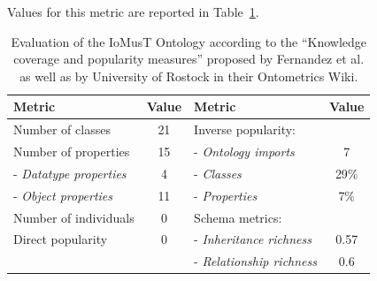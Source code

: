 Values for this metric are reported in Table~\ref{tab:metrics}.

\begin{table}[h]
    \centering
        \caption{Evaluation of the IoMusT Ontology according to the ``Knowledge coverage and popularity measures'' proposed by Fernandez et al. \cite{fernandez2009what} as well as by University of Rostock in their Ontometrics Wiki\protect\footnotemark.}
    \label{tab:metrics}
    \begin{tabular}{lc||lc}
    \toprule
    \textbf{Metric} & \textbf{Value} & \textbf{Metric} & \textbf{Value}\\
    \midrule
        Number of classes & 21 & Inverse popularity: &  \\
        Number of properties & 15 & - \textit{Ontology imports} & 7\\
        - \textit{Datatype properties} & 4 & - \textit{Classes} & 29\% \\
        - \textit{Object properties} & 11 & - \textit{Properties} & 7\% \\
        Number of individuals & 0 & Schema metrics: &\\
        Direct popularity & 0 & - \textit{Inheritance richness} & 0.57 \\
        & & - \textit{Relationship richness} & 0.6 \\
    \bottomrule
    \end{tabular}
\end{table}

